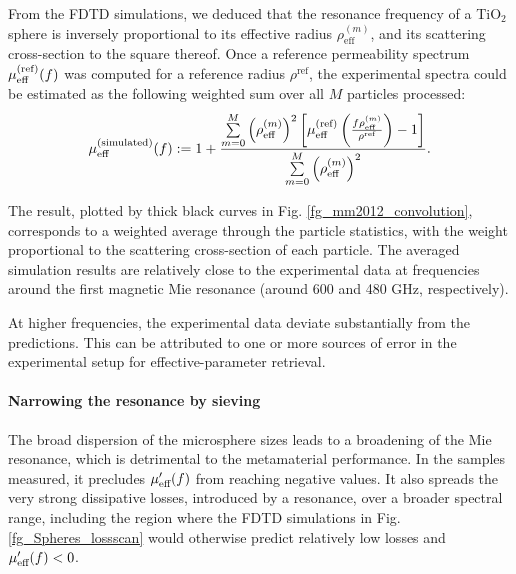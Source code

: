 From the FDTD simulations, we deduced that the resonance frequency of a TiO$_{2}$ sphere is inversely proportional to its effective radius $\rho_{\text{eff}}^{(m)}$, and its scattering cross-section to the square thereof. Once a reference permeability spectrum $\mu_{\text{eff} }^{\text{(ref)}}(f)$ was computed for a reference radius $\rho^{\text{ref}}$, the experimental spectra could be estimated as the following weighted sum over all $M$ particles processed:
\begin{equation} \mu_{\text{eff} }^{\text{(simulated)}}(f) := 1 + \frac{\sum\limits_{m=0}^{M} \left(\rho_{\text{eff}}^{(m)}\right)^{2} \left[ \mu_{\text{eff} }^{\text{(ref)}}\left(\frac{f \rho_{\text{eff}}^{(m)}}{\rho^{\text{ref}} }\right) - 1 \right]}{\sum\limits_{m=0}^{M} \left(\rho_{\text{eff}}^{(m)}\right)^{2}}. \label{eq_sumconvol}\end{equation}

	The result, plotted by thick black curves in Fig. \ref{fg_mm2012_convolution}, corresponds to a weighted average through the particle statistics, with the weight proportional to the scattering cross-section of each particle. The averaged simulation results are relatively close to the experimental data at frequencies around the first magnetic Mie resonance (around 600 and 480 GHz, respectively). 
	
	At higher frequencies, the experimental data deviate substantially from the predictions. This can be attributed to one or more sources of error in the experimental setup for effective-parameter retrieval.



\paragraph{Narrowing the resonance by sieving} %
The broad dispersion of the microsphere sizes leads to a broadening of the Mie resonance, which is detrimental to the metamaterial performance. In the samples measured, it precludes $\mu_{\text{eff} }'(f)$ from reaching negative values. It also spreads the very strong dissipative losses, introduced by a resonance, over a broader spectral range, including the region where the FDTD simulations in Fig. \ref{fg_Spheres_lossscan} would otherwise predict relatively low losses and $\mu_{\text{eff} }'(f) < 0$.

